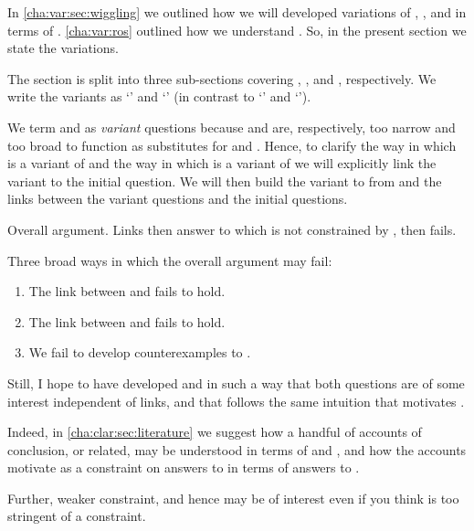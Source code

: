 \begin{note}
  In \autoref{cha:var:sec:wiggling} we outlined how we will developed variations of \qWhy{}, \qHow{}, and \issueInclusion{} in terms of \ros{}.
  \autoref{cha:var:ros} outlined how we understand .
  So, in the present section we state the variations.

  The section is split into three sub-sections covering \qWhy{}, \qHow{}, and \issueInclusion{}, respectively.
  We write the variants as `\qWhyVnP{}' and `\qHowV{}' (in contrast to `\qWhy{}' and `\qHow{}').

  We term \qWhyVnP{} and \qHowV{} as \emph{variant} questions because \qWhyVnP{} and \qHowV{} are, respectively, too narrow and too broad to function as substitutes for \qWhy{} and \qHow{}.
  Hence, to clarify the way in which \qWhyVnP{} is a variant of \qWhy{} and the way in which \qHowV{} is a variant of \qHow{} we will explicitly link the variant to the initial question.
  We will then build the variant to \issueInclusion{} from \issueInclusion{} and the links between the variant questions and the initial questions.
\end{note}

\begin{note}
  Overall argument.
  Links then answer to \qWhyVnP{} which is not constrained by \qHowV{}, then \issueInclusion{} fails.

  Three broad ways in which the overall argument may fail:
  \begin{enumerate}[label=\arabic*., ref=(\arabic*), noitemsep]
  \item
    The link between \qWhyVnP{} and \qHowV{} fails to hold.
  \item
    The link between \qHowV{} and \qHow{} fails to hold.
  \item
    We fail to develop counterexamples to \issueConstraint{}.
  \end{enumerate}

  Still, I hope to have developed \qWhyVnP{} and \qHowV{} in such a way that both questions are of some interest independent of links, and that \issueConstraint{} follows the same intuition that motivates \issueInclusion{}.

  Indeed, in \autoref{cha:clar:sec:literature} we suggest how a handful of accounts of conclusion, or related, may be understood in terms of \qWhyVnP{} and \qHowV{}, and how the accounts motivate \issueConstraint{} as a constraint on answers to \qWhyVnP{} in terms of answers to \qHowV{}.

  Further, weaker constraint, and hence may be of interest even if you think \issueInclusion{} is too stringent of a constraint.
\end{note}

